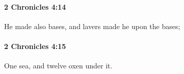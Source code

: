 		\paragraph{2 Chronicles 4:14} %
			\label{2CHRONICLES-4-14}

			He made also bases, and lavers made he upon the bases;


		\paragraph{2 Chronicles 4:15} %
			\label{2CHRONICLES-4-15}

			One sea, and twelve oxen under it.


